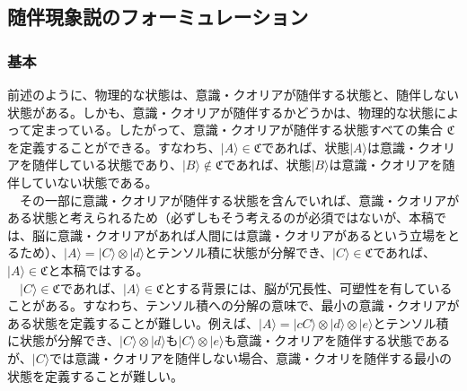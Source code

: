 \subsection{随伴現象説のフォーミュレーション}
\subsubsection{基本}
前述のように、物理的な状態は、意識・クオリアが随伴する状態と、随伴しない状態がある。しかも、意識・クオリアが随伴するかどうかは、物理的な状態によって定まっている。したがって、意識・クオリアが随伴する状態すべての集合 $\mathfrak{C}$ を定義することができる。すなわち、$|A\rangle \in \mathfrak{C}$であれば、状態$|A\rangle$は意識・クオリアを随伴している状態であり、$|B\rangle \notin \mathfrak{C}$であれば、状態$|B\rangle$は意識・クオリアを随伴していない状態である。\\
　その一部に意識・クオリアが随伴する状態を含んでいれば、意識・クオリアがある状態と考えられるため（必ずしもそう考えるのが必須ではないが、本稿では、脳に意識・クオリアがあれば人間には意識・クオリアがあるという立場をとるため）、$|A\rangle = |C\rangle \otimes |d\rangle$とテンソル積に状態が分解でき、$|C\rangle\in\mathfrak{C}$であれば、$|A\rangle\in\mathfrak{C}$と本稿ではする。\\
　$|C\rangle\in\mathfrak{C}$であれば、$|A\rangle\in\mathfrak{C}$とする背景には、脳が冗長性、可塑性を有していることがある。すなわち、テンソル積への分解の意味で、最小の意識・クオリアがある状態を定義することが難しい。例えば、$|A\rangle = |cC\rangle \otimes |d\rangle \otimes |e\rangle$とテンソル積に状態が分解でき、$|C\rangle \otimes |d\rangle$も$|C\rangle \otimes |e\rangle$も意識・クオリアを随伴する状態であるが、$|C\rangle$では意識・クオリアを随伴しない場合、意識・クオリを随伴する最小の状態を定義することが難しい。